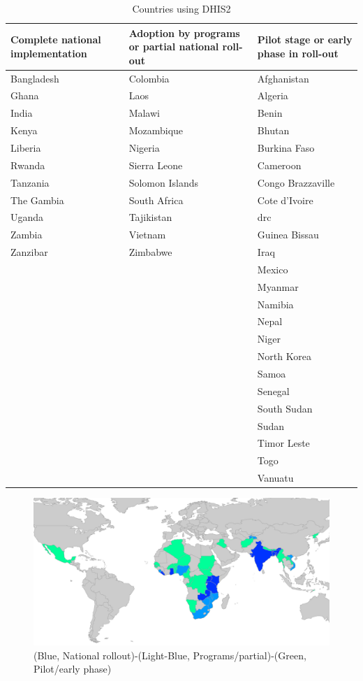 \begin{table}
\centering
\begin{tabular}{|p{4cm}|p{4cm}|p{4cm}|}
\hline
\textbf{Complete national implementation} & \textbf{Adoption by programs or partial national roll-out} & \textbf{Pilot stage or early phase in roll-out} \\
\hline
Bangladesh & Colombia & Afghanistan\\
Ghana & Laos & Algeria\\
India & Malawi & Benin\\
Kenya & Mozambique & Bhutan\\
Liberia & Nigeria & Burkina Faso\\
Rwanda & Sierra Leone & Cameroon\\
Tanzania & Solomon Islands & Congo Brazzaville\\
The Gambia & South Africa & Cote d'Ivoire\\
Uganda & Tajikistan & \gls{drc}\\
Zambia & Vietnam & Guinea Bissau\\
Zanzibar & Zimbabwe & Iraq\\
 & & Mexico\\
 & & Myanmar\\
 & & Namibia\\
 & & Nepal\\
 & & Niger\\
 & & North Korea\\
 & & Samoa\\
 & & Senegal\\
 & & South Sudan\\
 & & Sudan\\
 & & Timor Leste\\
 & & Togo\\
 & & Vanuatu\\
\hline
\end{tabular}
\caption{Countries using DHIS2}
\label{table:countriesusing}
\end{table}

\begin{figure}
\centering
\includegraphics[width=\columnwidth]{context/img/countriesUsing}
\caption{(Blue, National rollout)-(Light-Blue, Programs/partial)-(Green, Pilot/early phase)}
\label{fig:countriesusing}
\end{figure}


